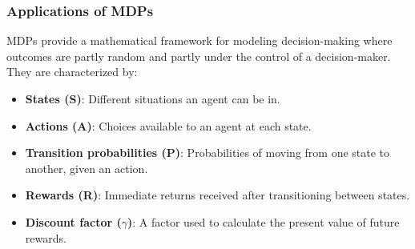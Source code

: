 \documentclass[aspectratio=169]{beamer}
\begin{document}
\begin{frame}[fragile]
  \frametitle{Applications of MDPs}
  MDPs provide a mathematical framework for modeling decision-making where outcomes are partly random and partly under the control of a decision-maker. They are characterized by:
  
  \begin{itemize}
    \item \textbf{States (S)}: Different situations an agent can be in.
    \item \textbf{Actions (A)}: Choices available to an agent at each state.
    \item \textbf{Transition probabilities (P)}: Probabilities of moving from one state to another, given an action.
    \item \textbf{Rewards (R)}: Immediate returns received after transitioning between states.
    \item \textbf{Discount factor ($\gamma$)}: A factor used to calculate the present value of future rewards.
  \end{itemize}
\end{frame}
\end{document}
